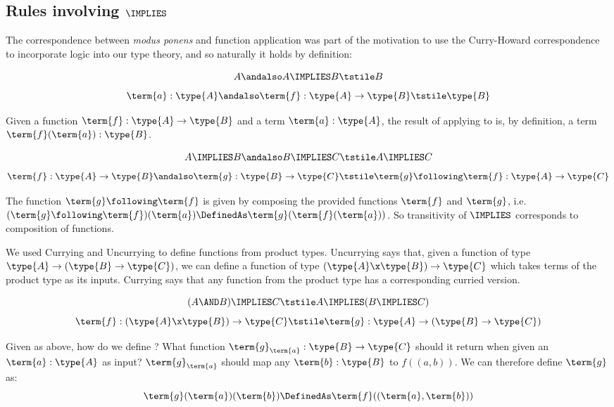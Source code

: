 \newpage
\subsection{Rules involving $\IMPLIES$}



The correspondence between \emph{modus ponens} and function application was part of the motivation to use the Curry-Howard correspondence to incorporate logic into our type theory, and so naturally it holds by definition:

\begin{Theorem}
\[
A\andalso A \IMPLIES B \tstile B
\]
\[
\term{a}:\type{A}\andalso \term{f}:\type{A} \to \type{B} \tstile \type{B}
\]
\end{Theorem}
\begin{Proof}
Given a function $\term{f}:\type{A} \to \type{B}$ and a term $\term{a}:\type{A}$, the result of applying  to  is, by definition, a term $\term{f}(\term{a}):\type{B}$.
\end{Proof}





\begin{Theorem}
\label{thm:Transitivity=>}
\[
A \IMPLIES B\andalso 
B \IMPLIES C
\tstile
A \IMPLIES C
\]
\[
\term{f}:\type{A} \to \type{B}\andalso
\term{g}:\type{B} \to \type{C} 
\tstile
\term{g} \following \term{f}:\type{A} \to \type{C} 
\]
\end{Theorem}
\begin{Proof}
The function $\term{g} \following \term{f}$ is given by composing the provided functions $\term{f}$ and $\term{g}$, i.e. 
$(\term{g} \following \term{f})(\term{a}) \DefinedAs \term{g}(\term{f}(\term{a}))$.  So transitivity of $\IMPLIES$ corresponds to composition of functions.
\end{Proof}




We used Currying and Uncurrying to define functions from product types.   Uncurrying says that, given a function of type 
$\type{A} \to (\type{B} \to \type{C})$, we can define a function of type
$(\type{A} \x \type{B}) \to \type{C}$
which takes terms of the product type as its inputs.
Currying says that any function from the product type has a corresponding curried version.  

\begin{Theorem}[Currying]
\[
(A \AND B) \IMPLIES C 
\tstile
A \IMPLIES (B \IMPLIES C)
\]
\[
\term{f}:(\type{A} \x \type{B}) \to \type{C}
\tstile
\term{g}:\type{A} \to (\type{B} \to \type{C})
\]
\end{Theorem}
\begin{Proof}
Given  as above, how do we define ?  What function $\term{g}_{\term{a}}:\type{B} \to \type{C}$ should it return when given an $\term{a}:\type{A}$ as input?  $\term{g}_{\term{a}}$ should map any $\term{b}:\type{B}$ to $f((a,b))$.  We can therefore define $\term{g}$ as:
\[
\term{g}(\term{a})(\term{b}) \DefinedAs \term{f}((\term{a},\term{b}))
\]
\end{Proof}


